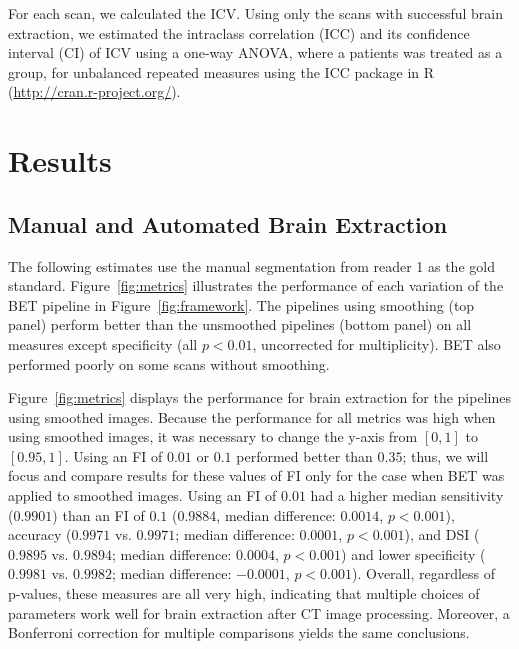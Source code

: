 For each scan, we calculated the ICV.  Using only the scans with successful brain extraction, we estimated the intraclass correlation (ICC) and its confidence interval (CI) of ICV using a one-way ANOVA, where a patients was treated as a group, for unbalanced repeated measures \citep{searle_linear_2012, thomas_interval_1978, donner_use_1979, lessells_unrepeatable_1987} using the ICC package \citep{wolak_guidelines_2012} in R (\url{http://cran.r-project.org/}).  



\section{Results}
\subsection{Manual and Automated Brain Extraction}
The following estimates use the manual segmentation from reader 1 as the gold standard. Figure~\ref{fig:metrics}\protect{} illustrates the performance of each variation of the BET pipeline in Figure~\ref{fig:framework}.  The pipelines using smoothing (top panel) perform better than the unsmoothed pipelines (bottom panel) on all measures except specificity (all $p < 0.01$, uncorrected for multiplicity).  BET also performed poorly on some scans without smoothing.  

Figure~\ref{fig:metrics}\protect{} displays the performance for brain extraction for the pipelines using smoothed images.   Because the performance for all metrics was high when using smoothed images, it was necessary to change the y-axis from $[0,1]$ to $[0.95,1]$. 
Using an FI of $0.01$ or $0.1$ performed better than $0.35$; thus, we will focus and compare results for these values of FI only for the case when BET was applied to smoothed images.  Using an FI of $0.01$ had a higher median sensitivity ($0.9901$) than an FI of $0.1$ ($0.9884$, median difference: $0.0014$, $p< 0.001$), accuracy ($0.9971$ vs. $0.9971$; median difference: $0.0001$, $p< 0.001$), and DSI ($0.9895$ vs. $0.9894$; median difference: $0.0004$, $p< 0.001$) and lower specificity ($0.9981$ vs. $0.9982$; median difference: $-0.0001$, $p< 0.001$).  Overall, regardless of p-values, these measures are all very high, indicating that multiple choices of parameters work well for brain extraction after CT image processing.  Moreover, a Bonferroni correction for multiple comparisons yields the same conclusions. 

